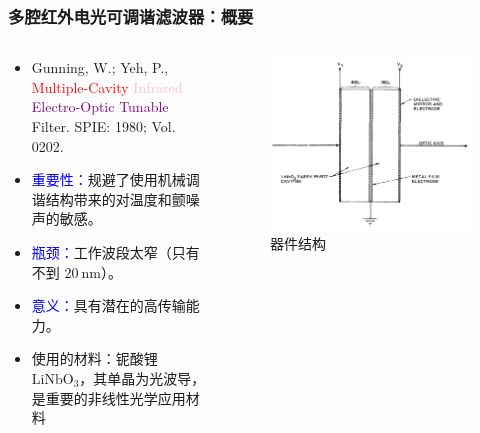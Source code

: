 \begin{frame}[c]
    \frametitle{多腔红外电光可调谐滤波器：概要}
    \begin{columns}
        \begin{column}{.6\textwidth}
            \begin{itemize}
                \item Gunning, W.; Yeh, P., \textcolor{red}{Multiple-Cavity} \textcolor{pink}{Infrared} \textcolor{purple}{Electro-Optic Tunable} Filter. SPIE: 1980; Vol. 0202.
                \item \textcolor{blue}{重要性：}规避了使用机械调谐结构带来的对温度和颤噪声的敏感。
                \item \textcolor{blue}{瓶颈：}工作波段太窄（只有不到 $20\ \mathrm{nm}$）。
                \item \textcolor{blue}{意义：}具有潜在的高传输能力。
                \item \footnotesize{使用的材料：铌酸锂 $\mathrm{LiNbO}_3$，其单晶为光波导，是重要的非线性光学应用材料}
            \end{itemize}
        \end{column}
        \begin{column}{.4\textwidth}
            \begin{figure}[H] %
                \centering %
                \includegraphics[width=1.\textwidth]{figures/Multiple-Cavity Infrared Electro-Optic Tunable Filter_2.png} %
                \caption{器件结构}
            \end{figure}
        \end{column}
    \end{columns}


\end{frame}
